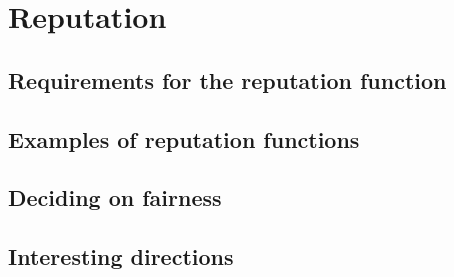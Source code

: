 \chapter{Reputation}
\section{Requirements for the reputation function}

\section{Examples of reputation functions}

\section{Deciding on fairness}

\section{Interesting directions}